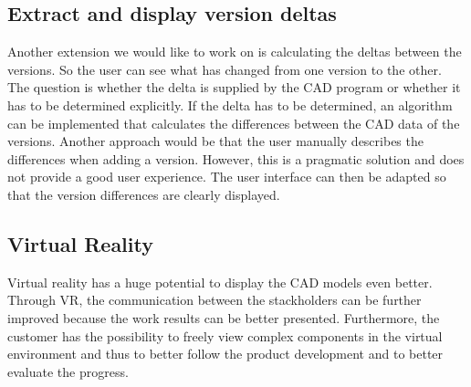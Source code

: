 \subsection*{Extract and display version deltas}
Another extension we would like to work on is calculating the deltas between the versions. So the user can see what has changed from one version to the other. The question is whether the delta is supplied by the CAD program or whether it has to be determined explicitly. If the delta has to be determined, an algorithm can be implemented that calculates the differences between the CAD data of the versions. Another approach would be that the user manually describes the differences when adding a version. However, this is a pragmatic solution and does not provide a good user experience. The user interface can then be adapted so that the version differences are clearly displayed.

\subsection*{Virtual Reality}
Virtual reality has a huge potential to display the CAD models even better. Through VR, the communication between the stackholders can be further improved because the work results can be better presented. Furthermore, the customer has the possibility to freely view complex components in the virtual environment and thus to better follow the product development and to better evaluate the progress.
